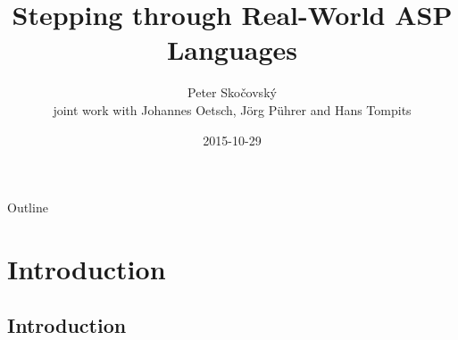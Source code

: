 \documentclass{beamer}
\title[Stepping through ASP]
{Stepping through Real-World ASP Languages}
\author[P. Skočovský]
{
	Peter Skočovský\\
	\scriptsize
	joint work with Johannes Oetsch, Jörg Pührer and Hans Tompits %
}
\date
{2015-10-29}
\begin{document}
\begin{frame}
	\titlepage
\end{frame}

\begin{frame}{Outline}
	\tableofcontents[hideallsubsections]
\end{frame}



\section{Introduction}


\subsection{Introduction}
\end{document}
